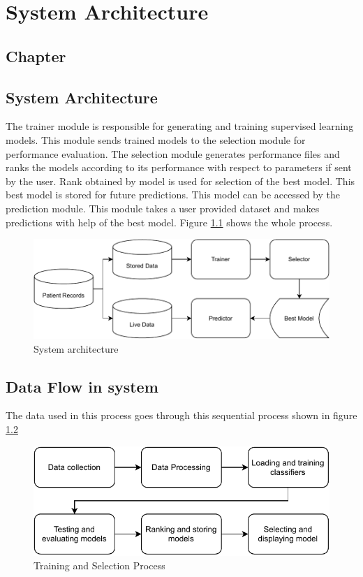 \thispagestyle{fancy}
\chapter{System Architecture} \label{ch:system_architecture}
\section*{\centering Chapter \thechapter}
\section*{\centering System Architecture}


The trainer module is responsible for generating and training supervised learning models. This
module sends trained models to the selection module for performance evaluation. The selection
module generates performance files and ranks the models according to its performance with
respect to parameters if sent by the user. Rank obtained by model is used for selection of the
best model. This best model is stored for future predictions. This model can be accessed by the
prediction module. This module takes a user provided dataset and makes predictions with help of
the best model. Figure \ref{fig:system_architecture} shows the whole process.

\begin{figure}[H]
    \centering
    \includegraphics[width=0.7\columnwidth]{media/architecture/System Architecture.pdf}
    \caption{System architecture}
    \label{fig:system_architecture}
\end{figure}

\section{Data Flow in system}

The data used in this process goes through this sequential process shown in figure
\ref{fig:data_flow_in_system}

\begin{figure}[H]
    \centering
    \includegraphics[width=0.7\columnwidth]{media/website/architecture/Data_Flow_System.pdf}
    \caption{Training and Selection Process}
    \label{fig:data_flow_in_system}
\end{figure}

